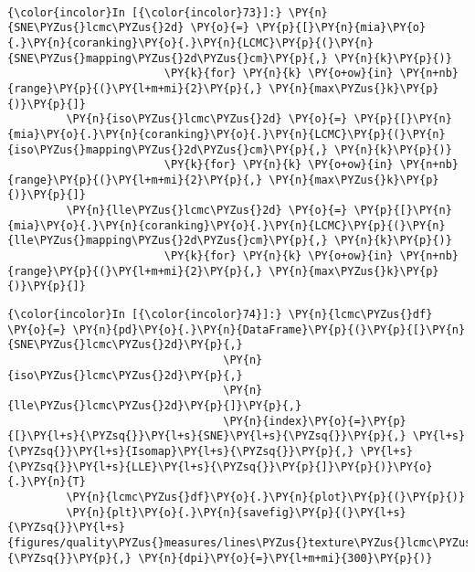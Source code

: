     \begin{center}
    \end{center}
    { \hspace*{\fill} \\}

    \begin{Verbatim}[commandchars=\\\{\}]
{\color{incolor}In [{\color{incolor}73}]:} \PY{n}{SNE\PYZus{}lcmc\PYZus{}2d} \PY{o}{=} \PY{p}{[}\PY{n}{mia}\PY{o}{.}\PY{n}{coranking}\PY{o}{.}\PY{n}{LCMC}\PY{p}{(}\PY{n}{SNE\PYZus{}mapping\PYZus{}2d\PYZus{}cm}\PY{p}{,} \PY{n}{k}\PY{p}{)}
                        \PY{k}{for} \PY{n}{k} \PY{o+ow}{in} \PY{n+nb}{range}\PY{p}{(}\PY{l+m+mi}{2}\PY{p}{,} \PY{n}{max\PYZus{}k}\PY{p}{)}\PY{p}{]}
         \PY{n}{iso\PYZus{}lcmc\PYZus{}2d} \PY{o}{=} \PY{p}{[}\PY{n}{mia}\PY{o}{.}\PY{n}{coranking}\PY{o}{.}\PY{n}{LCMC}\PY{p}{(}\PY{n}{iso\PYZus{}mapping\PYZus{}2d\PYZus{}cm}\PY{p}{,} \PY{n}{k}\PY{p}{)}
                        \PY{k}{for} \PY{n}{k} \PY{o+ow}{in} \PY{n+nb}{range}\PY{p}{(}\PY{l+m+mi}{2}\PY{p}{,} \PY{n}{max\PYZus{}k}\PY{p}{)}\PY{p}{]}
         \PY{n}{lle\PYZus{}lcmc\PYZus{}2d} \PY{o}{=} \PY{p}{[}\PY{n}{mia}\PY{o}{.}\PY{n}{coranking}\PY{o}{.}\PY{n}{LCMC}\PY{p}{(}\PY{n}{lle\PYZus{}mapping\PYZus{}2d\PYZus{}cm}\PY{p}{,} \PY{n}{k}\PY{p}{)}
                        \PY{k}{for} \PY{n}{k} \PY{o+ow}{in} \PY{n+nb}{range}\PY{p}{(}\PY{l+m+mi}{2}\PY{p}{,} \PY{n}{max\PYZus{}k}\PY{p}{)}\PY{p}{]}
\end{Verbatim}

    \begin{Verbatim}[commandchars=\\\{\}]
{\color{incolor}In [{\color{incolor}74}]:} \PY{n}{lcmc\PYZus{}df} \PY{o}{=} \PY{n}{pd}\PY{o}{.}\PY{n}{DataFrame}\PY{p}{(}\PY{p}{[}\PY{n}{SNE\PYZus{}lcmc\PYZus{}2d}\PY{p}{,}
                                 \PY{n}{iso\PYZus{}lcmc\PYZus{}2d}\PY{p}{,}
                                 \PY{n}{lle\PYZus{}lcmc\PYZus{}2d}\PY{p}{]}\PY{p}{,}
                                 \PY{n}{index}\PY{o}{=}\PY{p}{[}\PY{l+s}{\PYZsq{}}\PY{l+s}{SNE}\PY{l+s}{\PYZsq{}}\PY{p}{,} \PY{l+s}{\PYZsq{}}\PY{l+s}{Isomap}\PY{l+s}{\PYZsq{}}\PY{p}{,} \PY{l+s}{\PYZsq{}}\PY{l+s}{LLE}\PY{l+s}{\PYZsq{}}\PY{p}{]}\PY{p}{)}\PY{o}{.}\PY{n}{T}
         \PY{n}{lcmc\PYZus{}df}\PY{o}{.}\PY{n}{plot}\PY{p}{(}\PY{p}{)}
         \PY{n}{plt}\PY{o}{.}\PY{n}{savefig}\PY{p}{(}\PY{l+s}{\PYZsq{}}\PY{l+s}{figures/quality\PYZus{}measures/lines\PYZus{}texture\PYZus{}lcmc\PYZus{}2d.png}\PY{l+s}{\PYZsq{}}\PY{p}{,} \PY{n}{dpi}\PY{o}{=}\PY{l+m+mi}{300}\PY{p}{)}
\end{Verbatim}

